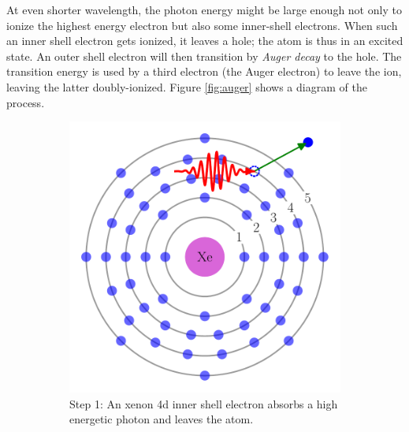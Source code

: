 At even shorter wavelength, the photon energy might be large enough not only
to ionize the highest energy electron but also some inner-shell electrons.
When such an inner shell electron gets ionized, it leaves a hole; the atom is
thus in an excited state. An outer shell electron will then transition by
\textit{Auger decay} to the hole. The transition energy is used by a third
electron (the Auger electron) to leave the ion, leaving the latter
doubly-ionized. Figure \ref{fig:auger} shows a diagram of the process.

\begin{figure}
 \centering
    \begin{subfigure}[t]{0.45\columnwidth}
        \centering
        \includegraphics[width=\textwidth]{figures/auger_step_1}
        \caption{Step 1: An xenon 4d inner shell electron absorbs a high
                 energetic photon and leaves the atom.}
        \label{fig:auger:1}
    \end{subfigure}
    \hspace{20pt}
    \begin{subfigure}[t]{0.45\columnwidth}
        \centering

\end{subfigure}
\end{figure}
